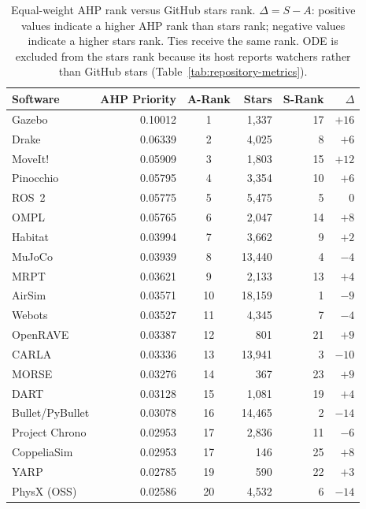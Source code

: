 \begin{table}[p]
\centering
\caption{Equal-weight AHP rank versus GitHub stars rank. $\Delta = S - A$: positive values indicate a higher AHP rank than stars rank; negative values indicate a higher stars rank. Ties receive the same rank. ODE is excluded from the stars rank because its host reports watchers rather than GitHub stars (Table~\ref{tab:repository-metrics}).}
\label{tab:quality-vs-community}
\small
\singlespacing
\begin{tabular}{@{}P{2.5cm}rcrrr@{}}
\toprule
\textbf{Software} & \textbf{AHP Priority} & \textbf{A-Rank} & \textbf{Stars} & \textbf{S-Rank} & \textbf{$\Delta$} \\
\midrule
Gazebo          & 0.10012 & 1  & 1,337  & 17 & $+16$ \\
Drake           & 0.06339 & 2  & 4,025  & 8  & $+6$  \\
MoveIt!         & 0.05909 & 3  & 1,803  & 15 & $+12$ \\
Pinocchio       & 0.05795 & 4  & 3,354  & 10 & $+6$  \\
ROS~2           & 0.05775 & 5  & 5,475  & 5  & $0$   \\
OMPL            & 0.05765 & 6  & 2,047  & 14 & $+8$  \\
Habitat         & 0.03994 & 7  & 3,662  & 9  & $+2$  \\
MuJoCo          & 0.03939 & 8  & 13,440 & 4  & $-4$  \\
MRPT            & 0.03621 & 9  & 2,133  & 13 & $+4$  \\
AirSim          & 0.03571 & 10 & 18,159 & 1  & $-9$  \\
Webots          & 0.03527 & 11 & 4,345  & 7  & $-4$  \\
OpenRAVE        & 0.03387 & 12 & 801    & 21 & $+9$  \\
CARLA           & 0.03336 & 13 & 13,941 & 3  & $-10$ \\
MORSE           & 0.03276 & 14 & 367    & 23 & $+9$  \\
DART            & 0.03128 & 15 & 1,081  & 19 & $+4$  \\
Bullet/\allowbreak{}PyBullet & 0.03078 & 16 & 14,465 & 2 & $-14$ \\
Project Chrono  & 0.02953 & 17 & 2,836  & 11 & $-6$  \\
CoppeliaSim     & 0.02953 & 17 & 146    & 25 & $+8$  \\
YARP            & 0.02785 & 19 & 590    & 22 & $+3$  \\
PhysX (OSS)     & 0.02586 & 20 & 4,532  & 6  & $-14$ \\

\end{tabular}
\end{table}
